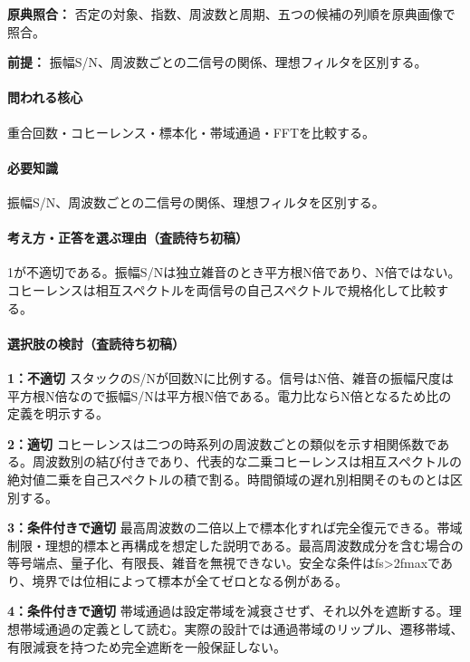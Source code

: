 \noindent\textbf{原典照合：} 否定の対象、指数、周波数と周期、五つの候補の列順を原典画像で照合。\par

\noindent\textbf{前提：} 振幅S/N、周波数ごとの二信号の関係、理想フィルタを区別する。\par

\paragraph{問われる核心} 重合回数・コヒーレンス・標本化・帯域通過・FFTを比較する。

\paragraph{必要知識} 振幅S/N、周波数ごとの二信号の関係、理想フィルタを区別する。

\paragraph{考え方・正答を選ぶ理由（査読待ち初稿）} 1が不適切である。振幅S/Nは独立雑音のとき平方根N倍であり、N倍ではない。コヒーレンスは相互スペクトルを両信号の自己スペクトルで規格化して比較する。

\paragraph{選択肢の検討（査読待ち初稿）}\mbox{}\par

\noindent\textbf{1：不適切} スタックのS/Nが回数Nに比例する。信号はN倍、雑音の振幅尺度は平方根N倍なので振幅S/Nは平方根N倍である。電力比ならN倍となるため比の定義を明示する。\par

\noindent\textbf{2：適切} コヒーレンスは二つの時系列の周波数ごとの類似を示す相関係数である。周波数別の結び付きであり、代表的な二乗コヒーレンスは相互スペクトルの絶対値二乗を自己スペクトルの積で割る。時間領域の遅れ別相関そのものとは区別する。\par

\noindent\textbf{3：条件付きで適切} 最高周波数の二倍以上で標本化すれば完全復元できる。帯域制限・理想的標本と再構成を想定した説明である。最高周波数成分を含む場合の等号端点、量子化、有限長、雑音を無視できない。安全な条件はfs>2fmaxであり、境界では位相によって標本が全てゼロとなる例がある。\par

\noindent\textbf{4：条件付きで適切} 帯域通過は設定帯域を減衰させず、それ以外を遮断する。理想帯域通過の定義として読む。実際の設計では通過帯域のリップル、遷移帯域、有限減衰を持つため完全遮断を一般保証しない。\par

